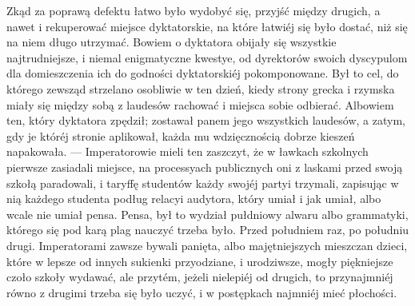 \documentclass{book}
\begin{document}
Zkąd za poprawą defektu łatwo było wydobyć się, przyjść między drugich, a nawet i rekuperować miejsce dyktatorskie, na które łatwiéj się było dostać, niż się na niem długo utrzymać. Bowiem o dyktatora obijały się wszystkie najtrudniejsze, i niemal enigmatyczne kwestye, od dyrektorów swoich dyscypulom dla domieszczenia ich do godności dyktatorskiéj pokomponowane. Był to cel, do którego zewsząd strzelano osobliwie w ten dzień, kiedy strony grecka i rzymska miały się między sobą z laudesów rachować i miejsca sobie odbierać. Albowiem ten, który dyktatora zpędził; zostawał panem jego wszystkich laudesów, a zatym, gdy je któréj stronie aplikował, każda mu wdzięcznością dobrze kieszeń napakowała. — Imperatorowie mieli ten zaszczyt, że w ławkach szkolnych pierwsze zasiadali miejsce, na processyach publicznych oni z laskami przed swoją szkołą paradowali, i taryffę studentów każdy swojéj partyi trzymali, zapisując w nią każdego studenta podług relacyi audytora, który umiał i jak umiał, albo wcale nie umiał pensa. Pensa, był to wydział pułdniowy alwaru albo grammatyki, którego się pod karą plag nauczyć trzeba było. Przed południem raz, po południu drugi. Imperatorami zawsze bywali panięta, albo majętniejszych mieszczan dzieci, które w lepsze od innych sukienki przyodziane, i urodziwsze, mogły piękniejsze czoło szkoły wydawać, ale przytém, jeżeli nielepiéj od drugich, to przynajmniéj równo z drugimi trzeba się było uczyć, i w postępkach najmniéj mieć płochości.
\end{document}
